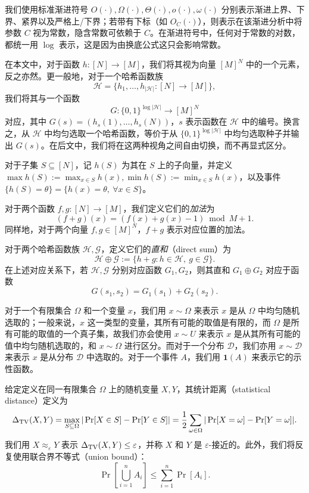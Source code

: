 我们使用标准渐进符号 $O(\cdot),\Omega(\cdot),\Theta(\cdot),o(\cdot),\omega(\cdot)$ 分别表示渐进上界、下界、紧界以及严格上/下界；若带有下标（如 $O_C(\cdot)$），则表示在该渐进分析中将参数 $C$ 视为常数，隐含常数可依赖于 $C$。在渐进符号中，任何对于常数的对数，都统一用 $\log$ 表示，这是因为由换底公式这只会影响常数。

在本文中，对于函数 $h:[N]\to[M]$，我们将其视为向量 $[M]^N$ 中的一个元素，反之亦然。更一般地，对于一个哈希函数族
$$
\mathcal{H} = \{h_1, \ldots, h_{|\mathcal{H}|} : [N] \to [M]\},
$$
我们将其与一个函数
$$
G : \{0,1\}^{\log |\mathcal{H}|} \to [M]^N
$$
对应，其中 $G(s) = (h_s(1), \ldots, h_s(N))$，$s$ 表示函数在 $\mathcal{H}$ 中的编号。换言之，从 $\mathcal{H}$ 中均匀选取一个哈希函数，等价于从 $\{0,1\}^{\log |\mathcal{H}|}$ 中均匀选取种子并输出 $G(s)$。在后文中，我们将在这两种视角之间自由切换，而不再显式区分。

对于子集 $S \subseteq [N]$，记 $h(S)$ 为其在 $S$ 上的子向量，并定义 $\max h(S):=\max_{x\in S}h(x), \min h(S):=\min_{x\in S}h(x)$，以及事件 $\{h(S)=\theta\} = \{h(x)=\theta,\ \forall x\in S\}$。

对于两个函数 $f, g : [N] \to [M]$，我们定义它们的\emph{加法}为
$$
(f + g)(x) = (f(x) + g(x) - 1) \bmod M + 1.
$$
同样地，对于两个向量 $f, g \in [M]^N$，$f + g$ 表示对应位置的加法。

对于两个哈希函数族 $\mathcal{H}, \mathcal{G}$，定义它们的\emph{直和}（direct sum）为
$$
\mathcal{H} \oplus \mathcal{G} := \{h + g : h \in \mathcal{H},\ g \in \mathcal{G}\}.
$$
在上述对应关系下，若 $\mathcal{H}, \mathcal{G}$ 分别对应函数 $G_1, G_2$，则其直和 $G_1 \oplus G_2$ 对应于函数
$$
G(s_1, s_2) = G_1(s_1) + G_2(s_2).
$$

对于一个有限集合 $\Omega$ 和一个变量 $x$，我们用 $x \sim \Omega$ 来表示 $x$ 是从 $\Omega$ 中均匀随机选取的；一般来说，$x$ 这一类型的变量，其所有可能的取值是有限的，而 $\Omega$ 是所有可能的取值的一个真子集，故我们亦会使用 $x \sim U$ 来表示 $x$ 是从其所有可能的值中均匀随机选取的，和 $x \sim \Omega$ 进行区分。而对于一个分布 $\mathcal{D}$，我们亦用 $x \sim \mathcal{D}$ 来表示 $x$ 是从分布 $\mathcal{D}$ 中选取的。对于一个事件 $A$，我们用 $\mathbf{1}(A)$ 来表示它的示性函数。

给定定义在同一有限集合 $\Omega$ 上的随机变量 $X,Y$，其统计距离（statistical distance）定义为
$$
\Delta_{\mathrm{TV}}(X,Y)
= \max_{S\subseteq \Omega} |\Pr[X\in S]-\Pr[Y\in S]|
= \frac{1}{2}\sum_{\omega\in\Omega} |\Pr[X=\omega]-\Pr[Y=\omega]|.
$$
我们用 $X \approx_\varepsilon Y$ 表示 $\Delta_{\mathrm{TV}}(X,Y)\le\varepsilon$，并称 $X$ 和 $Y$ 是 $\varepsilon$-接近的。此外，我们将反复使用联合界不等式（union bound）：
$$
\Pr\left[\bigcup_{i=1}^n A_i\right]\le \sum_{i=1}^n \Pr[A_i].
$$

